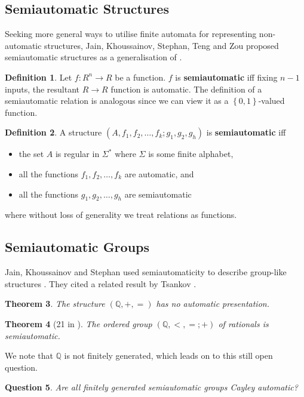 \documentclass[british,a4paper,]{scrartcl}
\newtheorem{theorem}{Theorem}
\newtheorem{question}[theorem]{Question}
\theoremstyle{definition}
\newtheorem{definition}[theorem]{Definition}
\theoremstyle{remark}
\newcommand{\set}[1]{\left\{ #1 \right\}}
\newcommand{\Q}{\mathbb{Q}}
\begin{document}
\subsection{Semiautomatic Structures}

Seeking more general ways to utilise finite automata for representing non-automatic structures,
Jain, Khoussainov, Stephan, Teng and Zou
proposed semiautomatic structures as a generalisation of  \autocite{semiauto}.
\begin{definition}
    Let \(f: R^n \to R\) be a function.
    \(f\) is \textbf{semiautomatic} iff fixing \(n-1\) inputs, the resultant \(R\to R\) function is automatic.
    The definition of a semiautomatic relation is analogous since we can view it as a \(\set{0,1}\)-valued function.
\end{definition}

\begin{definition}
    A structure \((A, f_1, f_2, \dots, f_k; g_1, g_2, g_h)\) is \textbf{semiautomatic} iff
    \begin{itemize}
        \item the set \(A\) is regular in \(\Sigma^*\) where \(\Sigma\) is some finite alphabet,
        \item all the functions \(f_1, f_2, \dots, f_k\) are automatic, and
        \item all the functions \(g_1, g_2, \dots, g_h\) are semiautomatic
    \end{itemize}
    where without loss of generality we treat relations as functions.
\end{definition}

\subsection{Semiautomatic Groups}
Jain, Khoussainov and Stephan used semiautomaticity to describe group-like structures \autocite{finitelysanjay}.
They cited a related result by Tsankov \autocite{tsankov}.
\begin{theorem}
    The structure \((\Q, +, =)\) has no automatic presentation.
\end{theorem}
\begin{theorem}[21 in \autocite{semiauto}]
    The ordered group \((\Q,<,=;+)\) of rationals is semiautomatic.
\end{theorem}

We note that \(\Q\) is not finitely generated, which leads on to this still open question.
\begin{question}
    Are all finitely generated semiautomatic groups Cayley automatic?
\end{question}
\end{document}
